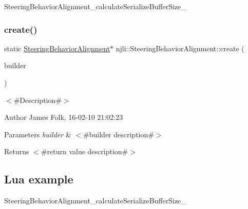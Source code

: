 \begin{DoxyCodeInclude}
\end{DoxyCodeInclude}
Steering\+Behavior\+Alignment\+\_\+calculate\+Serialize\+Buffer\+Size\+\_\+ \mbox{\label{classnjli_1_1_steering_behavior_alignment_aaec3d8b8e4c3eaab849953bb1352d0cc}} 
\subsubsection{\texorpdfstring{create()}{create()}\hspace{0.1cm}{\footnotesize\ttfamily [2/2]}}
{\footnotesize\ttfamily static \mbox{\hyperlink{classnjli_1_1_steering_behavior_alignment}{Steering\+Behavior\+Alignment}}$\ast$ njli\+::\+Steering\+Behavior\+Alignment\+::create (\begin{DoxyParamCaption}\item[{const \mbox{\hyperlink{classnjli_1_1_steering_behavior_alignment_builder}{Steering\+Behavior\+Alignment\+Builder}} \&}]{builder }\end{DoxyParamCaption})\hspace{0.3cm}{\ttfamily [static]}}



$<$\#\+Description\#$>$ 

\begin{DoxyAuthor}{Author}
James Folk, 16-\/02-\/10 21\+:02\+:23
\end{DoxyAuthor}

\begin{DoxyParams}{Parameters}
{\em builder} & $<$\#builder description\#$>$\\
\hline
\end{DoxyParams}
\begin{DoxyReturn}{Returns}
$<$\#return value description\#$>$
\end{DoxyReturn}
\hypertarget{classnjli_1_1_steering_behavior_wander_ex1}{}\subsection{Lua example}\label{classnjli_1_1_steering_behavior_wander_ex1}

\begin{DoxyCodeInclude}
\end{DoxyCodeInclude}
Steering\+Behavior\+Alignment\+\_\+calculate\+Serialize\+Buffer\+Size\+\_\+ \mbox{\label{classnjli_1_1_steering_behavior_alignment_a2f7ef7a5e93eb8081f7a00650cb6c5e4}} 
